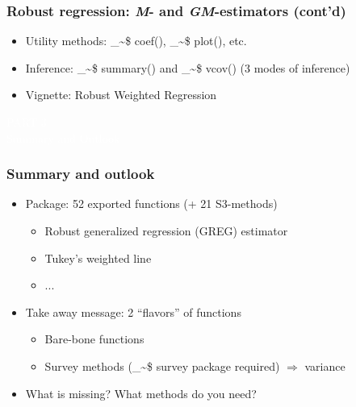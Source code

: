 \documentclass[framenumber,t]{beamer}
\makeatletter
\newcommand\code{\bgroup\@makeother\_\@makeother\~\@makeother\$\@makeother\^\@codex}
\def\@codex#1{{\normalfont\ttfamily\hyphenchar\font=-1 #1}\egroup}
\makeatother
\begin{document}
\begin{frame}
    \frametitle{Robust regression: \emph{M}- and \emph{GM}-estimators
        {\small (cont'd)}}
    \vspace{1em}
    \begin{itemize}
        \setlength\itemsep{1em}
        \item \alert{Utility methods:} \code{coef()}, \code{plot()}, etc.
        \item \alert{Inference:} \code{summary()} and \code{vcov()} (3 modes
            of inference)
        \item Vignette: \alert{Robust Weighted Regression}
    \end{itemize}
\end{frame}

\bgroup
{}
\begin{frame}[c,plain]{}
\begin{center}
    \textcolor{white}{\large PART 3}\\
    \vspace{1em}
    \textcolor{white}{\Huge Summary and Outlook}
\end{center}
\end{frame}
\egroup

\begin{frame}
    \frametitle{Summary and outlook}
    \vspace{1em}
    \begin{itemize}
        \setlength\itemsep{0.75em}
        \item Package: \alert{52 exported functions} (+ 21 S3-methods)
        \vspace{0.5em}
        {\large
        \begin{itemize}
            \setlength\itemsep{0.5em}
            \item Robust generalized regression (GREG) estimator
            \item Tukey's weighted line
            \item ...
        \end{itemize}
        }
        \item Take away message: \alert{2 ``flavors''} of functions
        \vspace{0.5em}
        {\large
        \begin{itemize}
            \setlength\itemsep{0.5em}
            \item Bare-bone functions
            \item Survey methods (\code{survey} package required)
                $\Rightarrow$ variance
        \end{itemize}
        }
        \item \alert{What is missing? What methods do you need?}
    \end{itemize}
\end{frame}
\end{document}
